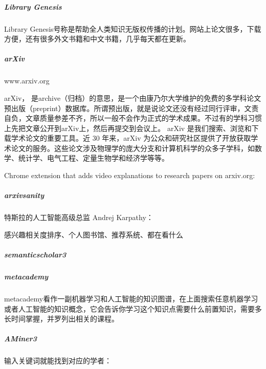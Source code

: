 \documentclass[letterpaper,11pt,english]{sphinxmanual}
\begin{document}
\subparagraph{Library Genesis}
\label{\detokenize{chapter_knowledge/research:library-genesis}}
Library
Genesis号称是帮助全人类知识无版权传播的计划。网站上论文很多，下载方便，还有很多外文书籍和中文书籍，几乎每天都在更新。


\subparagraph{arXiv}
\label{\detokenize{chapter_knowledge/research:arxiv}}
www.arxiv.org

arXiv，
是archive（归档）的意思，是一个由康乃尔大学维护的免费的多学科论文预出版（preprint）数据库。所谓预出版，就是说论文还没有经过同行评审，文责自负，文章质量参差不齐，所以一般不会作为正式的学术成果。不过有的学科习惯上先把文章公开到arXiv上，然后再提交到会议上。
arXiv 是我们搜索、浏览和下载学术论文的重要工具。近 30 年来，arXiv
为公众和研究社区提供了开放获取学术论文的服务。这些论文涉及物理学的庞大分支和计算机科学的众多子学科，如数学、统计学、电气工程、定量生物学和经济学等等。

Chrome extension that adds video explanations to research papers on
arxiv.org: 


\subparagraph{arxiv\sphinxhyphen{}sanity}
\label{\detokenize{chapter_knowledge/research:arxiv-sanity}}
特斯拉的人工智能高级总监 Andrej Karpathy：

感兴趣相关度排序、个人图书馆、推荐系统、都在看什么%
\begin{footnote}[591]\sphinxAtStartFootnote
{}
%
\end{footnote}



\subparagraph{semanticscholar3}
\label{\detokenize{chapter_knowledge/research:semanticscholar3}}


\subparagraph{metacademy}
\label{\detokenize{chapter_knowledge/research:metacademy}}

metacademy看作一副机器学习和人工智能的知识图谱，在上面搜索任意机器学习或者人工智能的知识概念，它会告诉你学习这个知识点需要什么前置知识，需要多长时间掌握，并罗列出相关的课程。


\subparagraph{AMiner3}
\label{\detokenize{chapter_knowledge/research:aminer3}}
输入关键词就能找到对应的学者： 

\end{document}
